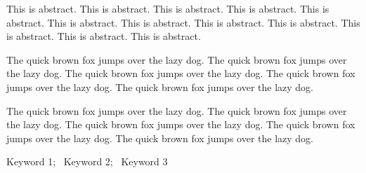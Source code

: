 

\begin{enabstract}

This is abstract. This is abstract. This is abstract. This is abstract. This is abstract. This is abstract. This is abstract. This is abstract. This is abstract. This is abstract. This is abstract. This is abstract.

The quick brown fox jumps over the lazy dog. The quick brown fox jumps over the lazy dog. The quick brown fox jumps over the lazy dog. The quick brown fox jumps over the lazy dog. The quick brown fox jumps over the lazy dog.

The quick brown fox jumps over the lazy dog. The quick brown fox jumps over the lazy dog. The quick brown fox jumps over the lazy dog. The quick brown fox jumps over the lazy dog. The quick brown fox jumps over the lazy dog.

\medskip
{} Keyword 1;~ Keyword 2;~ Keyword 3

\end{enabstract}

